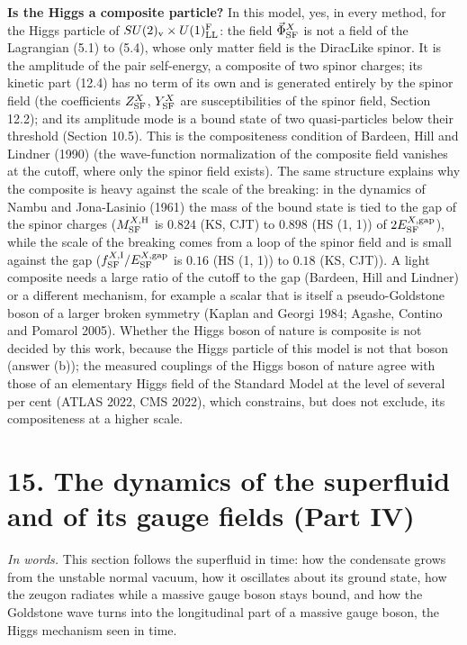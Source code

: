\documentclass[
  10pt,
]{article}
\begin{document}
\textbf{Is the Higgs a composite particle?} In this model, yes, in every
method, for the Higgs particle of
\(SU(2)_{\rm v}\times U(1)^{\rm F}_{\rm LL}\): the field
\(\vec\Phi^X_{\rm SF}\) is not a field of the Lagrangian (5.1) to (5.4),
whose only matter field is the DiracLike spinor. It is the amplitude of
the pair self-energy, a composite of two spinor charges; its kinetic
part (12.4) has no term of its own and is generated entirely by the
spinor field (the coefficients \(Z^X_{\rm SF}\), \(Y^X_{\rm SF}\) are
susceptibilities of the spinor field, Section 12.2); and its amplitude
mode is a bound state of two quasi-particles below their threshold
(Section 10.5). This is the compositeness condition of Bardeen, Hill and
Lindner (1990) (the wave-function normalization of the composite field
vanishes at the cutoff, where only the spinor field exists). The same
structure explains why the composite is heavy against the scale of the
breaking: in the dynamics of Nambu and Jona-Lasinio (1961) the mass of
the bound state is tied to the gap of the spinor charges
(\(M^{X,{\rm H}}_{\rm SF}\) is \(0.824\) (KS, CJT) to \(0.898\) (HS (1,
1)) of \(2E^{X,{\rm gap}}_{\rm SF}\)), while the scale of the breaking
comes from a loop of the spinor field and is small against the gap
(\(f^{X,{\rm I}}_{\rm SF}/E^{X,{\rm gap}}_{\rm SF}\) is \(0.16\) (HS (1,
1)) to \(0.18\) (KS, CJT)). A light composite needs a large ratio of the
cutoff to the gap (Bardeen, Hill and Lindner) or a different mechanism,
for example a scalar that is itself a pseudo-Goldstone boson of a larger
broken symmetry (Kaplan and Georgi 1984; Agashe, Contino and Pomarol
2005). Whether the Higgs boson of nature is composite is not decided by
this work, because the Higgs particle of this model is not that boson
(answer (b)); the measured couplings of the Higgs boson of nature agree
with those of an elementary Higgs field of the Standard Model at the
level of several per cent (ATLAS 2022, CMS 2022), which constrains, but
does not exclude, its compositeness at a higher scale.

\hypertarget{the-dynamics-of-the-superfluid-and-of-its-gauge-fields-part-iv}{%
\section{15. The dynamics of the superfluid and of its gauge fields
(Part
IV)}\label{the-dynamics-of-the-superfluid-and-of-its-gauge-fields-part-iv}}

\emph{In words.} This section follows the superfluid in time: how the
condensate grows from the unstable normal vacuum, how it oscillates
about its ground state, how the zeugon radiates while a massive gauge
boson stays bound, and how the Goldstone wave turns into the
longitudinal part of a massive gauge boson, the Higgs mechanism seen in
time.
\end{document}
